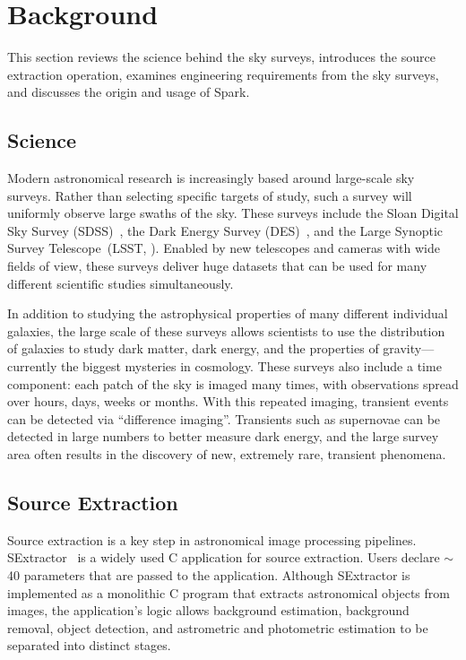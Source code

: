 \documentclass[10pt, conference, compsocconf]{IEEEtran}
\begin{document}
\section{Background}
\label{sec:Background}

This section reviews the science behind the sky surveys, introduces the source extraction operation, examines engineering requirements from the sky surveys, and discusses the origin and usage of Spark.

\subsection{Science}

Modern astronomical research is increasingly based around large-scale sky surveys.
Rather than selecting specific targets of study, such a survey will uniformly observe large
swaths of the sky. These surveys include the Sloan Digital Sky Survey (SDSS)~\cite{york00},
the Dark Energy Survey (DES)~\cite{dark05}, and the Large Synoptic Survey Telescope~(LSST,
\cite{ivezic08}). Enabled by new telescopes and cameras with wide fields of view, these
surveys deliver huge datasets that can be used for many different scientific studies
simultaneously.

In addition to studying the astrophysical properties of many different individual galaxies,
the large scale of these surveys allows scientists to use the distribution of galaxies to
study dark matter, dark energy, and the properties of gravity---currently the
biggest mysteries in cosmology. These surveys also include a time component: each patch of the sky is imaged many times,
with observations spread over hours, days, weeks or months. With this repeated imaging,
transient events can be detected via ``difference imaging''. Transients such as supernovae
can be detected in large numbers to better measure dark energy, and the large survey area
often results in the discovery of new, extremely rare, transient phenomena.

\subsection{Source Extraction}

Source extraction is a key step in astronomical image processing pipelines.
SExtractor~\cite{bertin96} is a widely used C application for source extraction.
Users declare $\sim$40 parameters that are passed to the application. Although
SExtractor is implemented as a monolithic C program that extracts astronomical
objects from images, the application's logic allows background estimation,
background removal, object detection, and astrometric and photometric estimation
to be separated into distinct stages.
\end{document}
